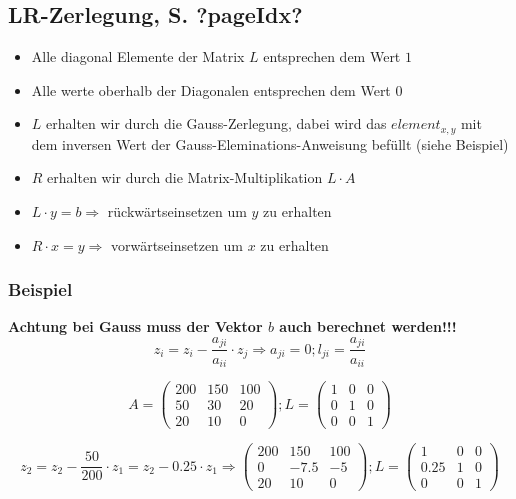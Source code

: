 \subsection{LR-Zerlegung, S. ?pageIdx?}

\begin{itemize}
\item Alle diagonal Elemente der Matrix $L$ entsprechen dem Wert $1$
\item Alle werte oberhalb der Diagonalen entsprechen dem Wert $0$ 
\item $L$ erhalten wir durch die Gauss-Zerlegung, dabei wird das $element_{x,y}$ mit dem inversen Wert der Gauss-Eleminations-Anweisung befüllt (siehe Beispiel)
\item $R$ erhalten wir durch die Matrix-Multiplikation $L\cdot A$
\item $L \cdot y = b \Rightarrow $ rückwärtseinsetzen um $y$ zu erhalten
\item $R \cdot x = y \Rightarrow $ vorwärtseinsetzen um $x$ zu erhalten
\end{itemize}

\subsubsection{Beispiel}
\textbf{Achtung bei Gauss muss der Vektor $b$ auch berechnet werden!!!}
\[ z_i = z_i - \frac{a_{ji}}{a_{ii}} \cdot z_j \Rightarrow a_{ji}=0; l_{ji}=\frac{a_{ji}}{a_{ii}}\]


\[ A= \left( \begin{array}{ccc}
200 & 150 & 100\\
50 & 30 & 20\\
20 & 10 & 0 \end{array}\right); L= \left( \begin{array}{ccc}
1 & 0 & 0\\
0 & 1 & 0\\
0 & 0 & 1\end{array} \right) \]

\[ z_2 = z_2 - \frac{50}{200} \cdot z_1 = z_2 - 0.25 \cdot z_1 \Rightarrow \left( \begin{array}{ccc}
200 & 150 & 100\\
0 & -7.5 & -5\\
20 & 10 & 0 \end{array}\right); L= \left( \begin{array}{ccc}
1 & 0 & 0\\
0.25 & 1 & 0\\
0 & 0 & 1\end{array} \right) \]

